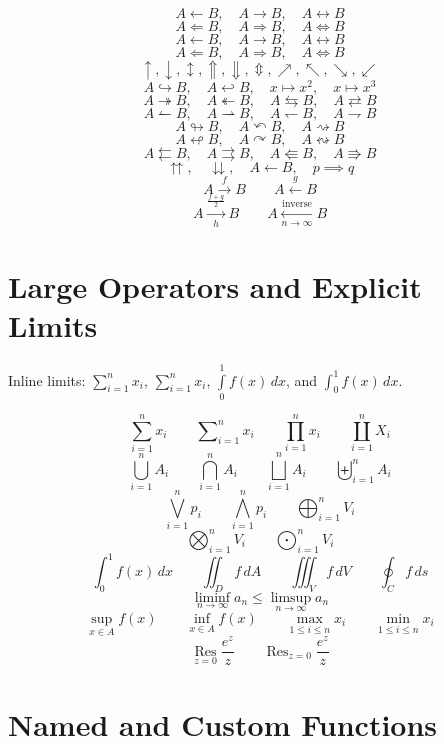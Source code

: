 \documentclass[12pt]{article}
\begin{document}
\[
A\leftarrow B,\quad A\rightarrow B,\quad A\leftrightarrow B
\]
\[
A\Leftarrow B,\quad A\Rightarrow B,\quad A\Leftrightarrow B
\]
\[
A\longleftarrow B,\quad A\longrightarrow B,\quad A\longleftrightarrow B
\]
\[
A\Longleftarrow B,\quad A\Longrightarrow B,\quad A\Longleftrightarrow B
\]
\[
\uparrow,\downarrow,\updownarrow,\Uparrow,\Downarrow,\Updownarrow,
\nearrow,\nwarrow,\searrow,\swarrow
\]
\[
A\hookrightarrow B,\quad A\hookleftarrow B,\quad x\mapsto x^2,\quad x\longmapsto x^3
\]
\[
A\twoheadrightarrow B,\quad A\twoheadleftarrow B,
\quad A\leftrightarrows B,\quad A\rightleftarrows B
\]
\[
A\leftharpoonup B,\quad A\rightharpoonup B,
\quad A\leftharpoondown B,\quad A\rightharpoondown B
\]
\[
A\looparrowright B,\quad A\curvearrowleft B,\quad A\rightsquigarrow B
\]
\[
A\looparrowleft B,\quad A\curvearrowright B,\quad A\leftrightsquigarrow B
\]
\[
A\leftleftarrows B,\quad A\rightrightarrows B,
\quad A\Lleftarrow B,\quad A\Rrightarrow B
\]
\[
\upuparrows,\quad \downdownarrows,\quad A\gets B,\quad p\implies q
\]
\[
A\xrightarrow{f}B \qquad A\xleftarrow{g}B
\]
\[
A\xrightarrow[h]{\frac{f+g}{2}}B
\qquad A\xleftarrow[n\to\infty]{\text{inverse}}B
\]

\section{Large Operators and Explicit Limits}

Inline limits: $\sum_{i=1}^{n}x_i$, $\sum\limits_{i=1}^{n}x_i$,
$\int\limits_0^1 f(x)\,dx$, and $\int\nolimits_0^1 f(x)\,dx$.

\[
\sum_{i=1}^{n}x_i \qquad \sum\nolimits_{i=1}^{n}x_i
\qquad \prod_{i=1}^{n}x_i \qquad \coprod_{i=1}^{n}X_i
\]
\[
\bigcup_{i=1}^{n}A_i \qquad \bigcap_{i=1}^{n}A_i
\qquad \bigsqcup_{i=1}^{n}A_i \qquad \biguplus_{i=1}^{n}A_i
\]
\[
\bigvee_{i=1}^{n}p_i \qquad \bigwedge_{i=1}^{n}p_i
\qquad \bigoplus_{i=1}^{n}V_i
\]
\[
\bigotimes_{i=1}^{n}V_i \qquad \bigodot_{i=1}^{n}V_i
\]
\[
\int_0^1 f(x)\,dx \qquad \iint_D f\,dA
\qquad \iiint_V f\,dV \qquad \oint_C f\,ds
\]
\[
\liminf_{n\to\infty}a_n \leq \limsup_{n\to\infty}a_n
\]
\[
\sup_{x\in A}f(x) \qquad \inf_{x\in A}f(x)
\qquad \max_{1\leq i\leq n}x_i \qquad \min_{1\leq i\leq n}x_i
\]
\[
\mathop{\mathrm{Res}}\limits_{z=0}\frac{e^z}{z}
\qquad \mathop{\mathrm{Res}}\nolimits_{z=0}\frac{e^z}{z}
\]

\section{Named and Custom Functions}
\end{document}
